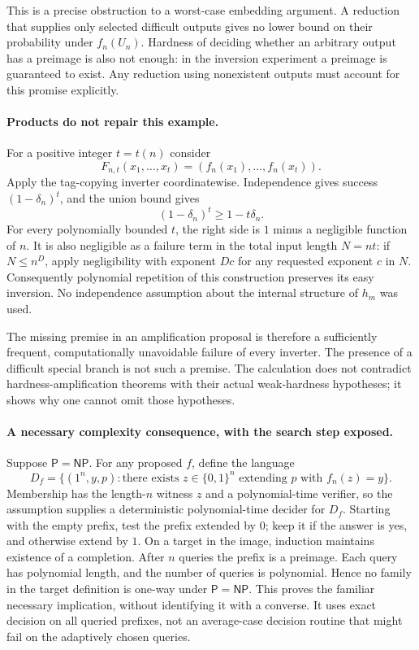 \documentclass[11pt]{article}
\begin{document}
This is a precise obstruction to a worst-case embedding argument. A reduction
that supplies only selected difficult outputs gives no lower bound on their
probability under $f_n(U_n)$. Hardness of deciding whether an arbitrary output
has a preimage is also not enough: in the inversion experiment a preimage is
guaranteed to exist. Any reduction using nonexistent outputs must account for
this promise explicitly.

\paragraph{Products do not repair this example.}
For a positive integer $t=t(n)$ consider
\[
 F_{n,t}(x_1,\ldots,x_t)
       =(f_n(x_1),\ldots,f_n(x_t)).
\]
Apply the tag-copying inverter coordinatewise. Independence gives success
$(1-\delta_n)^t$, and the union bound gives
\begin{equation}\label{a8:product}
                    (1-\delta_n)^t\ge1-t\delta_n.
\end{equation}
For every polynomially bounded $t$, the right side is $1$ minus a negligible
function of $n$. It is also negligible as a failure term in the total input
length $N=nt$: if $N\le n^D$, apply negligibility with exponent $Dc$ for any
requested exponent $c$ in $N$. Consequently polynomial repetition of this
construction preserves its easy inversion. No independence assumption about
the internal structure of $h_m$ was used.

The missing premise in an amplification proposal is therefore a sufficiently
frequent, computationally unavoidable failure of every inverter. The presence
of a difficult special branch is not such a premise. The calculation does not
contradict hardness-amplification theorems with their actual weak-hardness
hypotheses; it shows why one cannot omit those hypotheses.

\paragraph{A necessary complexity consequence, with the search step exposed.}
Suppose $\mathsf P=\mathsf{NP}$. For any proposed $f$, define the language
\[
 D_f=\{(1^n,y,p):\text{there exists }z\in\{0,1\}^n
                 \text{ extending }p\text{ with }f_n(z)=y\}.
\]
Membership has the length-$n$ witness $z$ and a polynomial-time verifier,
so the assumption supplies a deterministic polynomial-time decider for
$D_f$. Starting with the empty prefix, test the prefix extended by $0$;
keep it if the answer is yes, and otherwise extend by $1$. On a target in
the image, induction maintains existence of a completion. After $n$ queries
the prefix is a preimage. Each query has polynomial length, and the number
of queries is polynomial. Hence no family in the target definition is
one-way under $\mathsf P=\mathsf{NP}$. This proves the familiar necessary
implication, without identifying it with a converse. It uses exact decision
on all queried prefixes, not an average-case decision routine that might fail
on the adaptively chosen queries.
\end{document}
